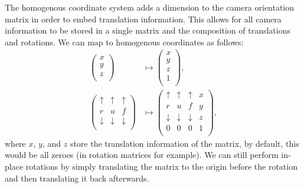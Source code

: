 The homogenous coordinate system adds a dimension to the camera orientation
matrix in order to embed translation information. This allows for all camera
information to be stored in a single matrix and the composition of translations
and rotations. We can map to homogenous coordinates as follows: \begin{align*}
    \begin{pmatrix}
        x \\ y \\ z \\
    \end{pmatrix} &\mapsto \begin{pmatrix}
        x \\ y \\ z \\ 1 \\
    \end{pmatrix}, \\
    \begin{pmatrix}
        \uparrow & \uparrow & \uparrow \\
        r & u & f \\
        \downarrow & \downarrow & \downarrow \\
    \end{pmatrix} &\mapsto \begin{pmatrix}
        \uparrow & \uparrow & \uparrow & x \\
        r & u & f & y \\
        \downarrow & \downarrow & \downarrow & z \\
        0 & 0 & 0 & 1 \\
    \end{pmatrix},
\end{align*} where $x$, $y$, and $z$ store the translation information of the
matrix, by default, this would be all zeroes (in rotation matrices for example).
We can still perform in-place rotations by simply translating the matrix to
the origin before the rotation and then translating it back afterwards. 

